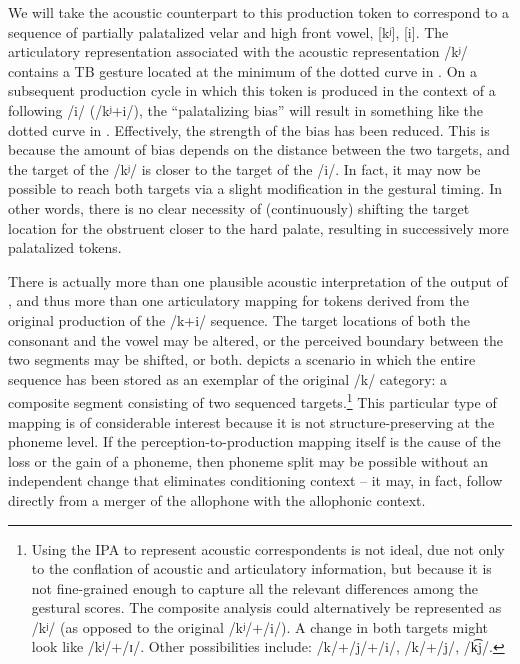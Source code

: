 We will take the acoustic counterpart to this production token to
correspond to a sequence of partially palatalized velar and high front vowel, {[kʲ]}, {[i]}. The articulatory representation associated with the acoustic
representation {/kʲ/} contains a TB gesture located at the
minimum of the dotted curve in . On a subsequent
production cycle in which this token is produced in the context of
a following {/i/} ({/kʲ+i/}), the “palatalizing
bias” will result in something like the dotted curve in .
Effectively, the strength of the bias has been reduced. This is because
the amount of bias depends on the distance between the two targets,
and the target of the {/kʲ/} is closer to the target of
the {/i/}. In fact, it may now be possible to reach both
targets via a slight modification in the gestural timing. In other
words, there is no clear necessity of (continuously) shifting the
target location for the obstruent closer to the hard palate, resulting
in successively more palatalized tokens. 

There is actually more than one plausible acoustic interpretation
of the output of , and thus more than one articulatory
mapping for tokens derived from the original production of the {/k+i/}
sequence. The target locations of both the consonant and the vowel
may be altered, or the perceived boundary between the two segments
may be shifted, or both.  depicts a
scenario in which the entire sequence has been stored as an exemplar
of the original {/k/} category: a composite segment consisting
of two sequenced targets.\footnote{Using the IPA to represent acoustic correspondents is not ideal, due
not only to the conflation of acoustic and articulatory information,
but because it is not fine-grained enough to capture all the relevant
differences among the gestural scores. The composite analysis could
alternatively be represented as {/kʲ/} (as opposed to the
original {/kʲ/+/i/}). A change in both targets might look
like {/kʲ/+/ɪ/}. Other possibilities include: {/k/+/j/+/i/},
{/k/+/j/}, {/k͡j/}.} This particular type of mapping is of considerable interest because
it is not structure-preserving at the phoneme level. If the perception-to-production mapping itself is the cause of the loss or the
gain of a phoneme, then phoneme split may be possible without an independent
change that eliminates conditioning context – it may, in fact, follow
directly from a merger of the allophone with the allophonic context. 

